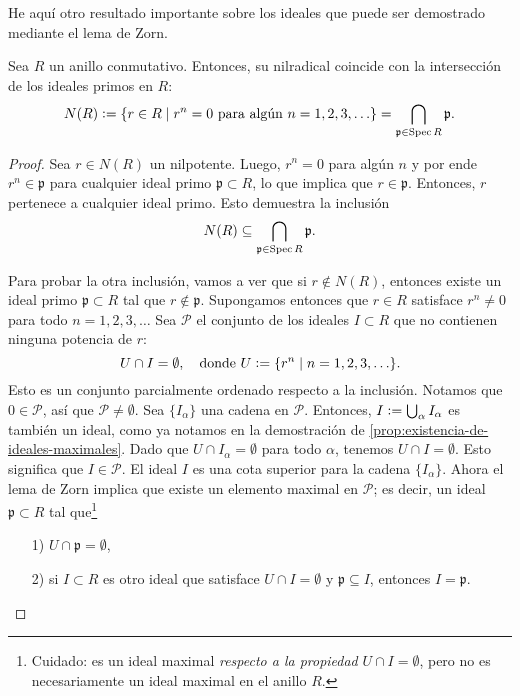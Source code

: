 He aquí otro resultado importante sobre los ideales que puede ser demostrado
mediante el lema de Zorn.

\begin{proposicion}
  Sea $R$ un anillo conmutativo. Entonces, su nilradical coincide con
  la intersección de los ideales primos en $R$:
  \[ N (R) \mathrel{\mathop:}= \{ r \in R \mid r^n = 0 \text{ para algún }n=1,2,3,\ldots \}
           = \bigcap_{\mathfrak{p} \in \operatorname{Spec} R} \mathfrak{p}. \]

  \begin{proof}
    Sea $r \in N (R)$ un nilpotente. Luego, $r^n = 0$ para algún $n$ y por ende
    $r^n \in \mathfrak{p}$ para cualquier ideal primo $\mathfrak{p} \subset R$,
    lo que implica que $r\in \mathfrak{p}$. Entonces, $r$ pertenece a cualquier
    ideal primo. Esto demuestra la inclusión
    $$N (R) \subseteq \bigcap_{\mathfrak{p} \in \operatorname{Spec} R} \mathfrak{p}.$$

    Para probar la otra inclusión, vamos a ver que si $r\notin N (R)$, entonces
    existe un ideal primo $\mathfrak{p} \subset R$ tal que
    $r\notin \mathfrak{p}$. Supongamos entonces que $r\in R$ satisface
    $r^n \ne 0$ para todo $n = 1,2,3,\ldots$ Sea $\mathcal{P}$ el conjunto de
    los ideales $I \subset R$ que no contienen ninguna potencia de $r$:
    \[ U \cap I = \emptyset, \quad
       \text{donde }U \mathrel{\mathop:}= \{ r^n \mid n = 1,2,3,\ldots \}.\]
    Esto es un conjunto parcialmente ordenado respecto a la inclusión.
    Notamos que $0 \in \mathcal{P}$, así que $\mathcal{P} \ne \emptyset$.
    Sea $\{ I_\alpha \}$ una cadena en $\mathcal{P}$. Entonces,
    $I \mathrel{\mathop:}= \bigcup_\alpha I_\alpha$ es también un ideal, como ya notamos en
    la demostración de \ref{prop:existencia-de-ideales-maximales}. Dado que
    $U \cap I_\alpha = \emptyset$ para todo $\alpha$, tenemos
    $U \cap I = \emptyset$. Esto significa que $I \in \mathcal{P}$. El ideal $I$
    es una cota superior para la cadena $\{ I_\alpha \}$. Ahora el lema de Zorn
    implica que existe un elemento maximal en $\mathcal{P}$; es decir, un ideal
    $\mathfrak{p} \subset R$ tal que\footnote{Cuidado: es un ideal maximal
      \emph{respecto a la propiedad} $U \cap I = \emptyset$, pero no es
      necesariamente un ideal maximal en el anillo $R$.}

    \begin{enumerate}
    \item[1)] $U \cap \mathfrak{p} = \emptyset$,

    \item[2)] si $I \subset R$ es otro ideal que satisface
      $U \cap I = \emptyset$ y $\mathfrak{p} \subseteq I$, entonces
      $I = \mathfrak{p}$.
    \end{enumerate}


\end{proof}
\end{proposicion}
